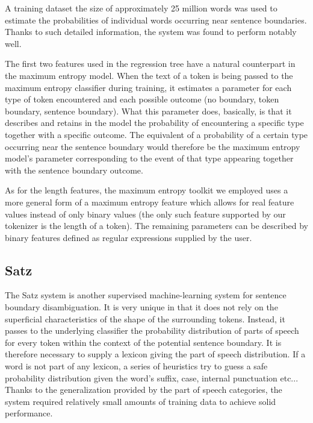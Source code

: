 A training dataset the size of approximately 25 million words was used to
estimate the probabilities of individual words occurring near sentence
boundaries. Thanks to such detailed information, the system was found to
perform notably well.

The first two features used in the regression tree have a natural counterpart
in the maximum entropy model. When the text of a token is being passed to the
maximum entropy classifier during training, it estimates a parameter for each
type of token encountered and each possible outcome (no boundary, token
boundary, sentence boundary). What this parameter does, basically, is that it
describes and retains in the model the probability of encountering a specific
type together with a specific outcome. The equivalent of a probability of a
certain type occurring near the sentence boundary would therefore be the
maximum entropy model's parameter corresponding to the event of that type
appearing together with the sentence boundary outcome.

As for the length features, the maximum entropy toolkit we employed uses a more
general form of a maximum entropy feature which allows for real feature values
instead of only binary values (the only such feature supported by our tokenizer
is the length of a token). The remaining parameters can be described by binary
features defined as regular expressions supplied by the user.

\subsection{Satz}
\label{sec:survey-satz}

The Satz system \cite{sbd-satz} is another supervised machine-learning system
for sentence boundary disambiguation. It is very unique in that it does not
rely on the superficial characteristics of the shape of the surrounding
tokens. Instead, it passes to the underlying classifier the probability
distribution of parts of speech for every token within the context of the
potential sentence boundary. It is therefore necessary to supply a lexicon
giving the part of speech distribution. If a word is not part of any lexicon,
a series of heuristics try to guess a safe probability distribution given the
word's suffix, case, internal punctuation etc... Thanks to the generalization
provided by the part of speech categories, the system required relatively
small amounts of training data to achieve solid performance. 

